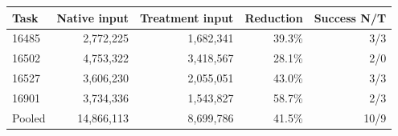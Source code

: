 \begin{tabular}{lrrrr}
\toprule
Task & Native input & Treatment input & Reduction & Success N/T \\
\midrule
16485 & 2,772,225 & 1,682,341 & 39.3\% & 3/3 \\
16502 & 4,753,322 & 3,418,567 & 28.1\% & 2/0 \\
16527 & 3,606,230 & 2,055,051 & 43.0\% & 3/3 \\
16901 & 3,734,336 & 1,543,827 & 58.7\% & 2/3 \\
\midrule
Pooled & 14,866,113 & 8,699,786 & 41.5\% & 10/9 \\
\bottomrule
\end{tabular}
